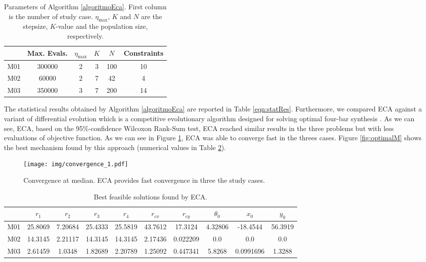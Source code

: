 \documentclass[12pt,letterpape]{article}
\begin{document}
\begin{table}[!ht]
	\centering
	\begin{tabular}{cccccc}
		    & Max. Evals. & $\eta_{\max}$ & $K$ & $N$ & Constraints \\ \hline
		M01 &   300000    &     2         &  3  & 100 & 10\\
		M02 &    60000    &     2         &  7  & 42  & 4 \\
		M03 &   350000    &     3         &  7  & 200 & 14\\
	\end{tabular}
	\caption{Parameters of Algorithm \ref{algoritmoEca}. First column is the number
	of study case. $\eta_{\max}$, $K$ and $N$ are the stepsize, $K$-value and the
	population size, respectively.}
	\label{tab:parms}
\end{table}
% 
% 
The statistical results obtained by Algorithm \ref{algoritmoEca} are reported in
Table \ref{eqn:statRes}. Furthermore, we compared ECA against a variant of differential
evolution \cite{ed1995} which is a competitive evolutionary algorithm designed for solving
optimal four-bar synthesis \cite{hernandez2016}. As we can see, ECA, based on the 95\%-confidence
Wilcoxon Rank-Sum test, ECA reached similar results in the three problems but with
less evaluations of objective function. As we can see in Figure \ref{fig:convMedian1},
ECA was able to converge fast in the threes cases.
Figure \ref{fig:optimalM} shows the best mechanism found by this approach (numerical
values in Table \ref{tab:valuesR}).

\begin{figure}[!ht]
	\centering
	\texttt{[image: img/convergence\_1.pdf]}
	\caption{Convergence at median. ECA provides fast convergence in three the study cases.}
	\label{fig:convMedian1}
\end{figure}

\begin{table}[!ht]
	\centering
	\begin{tabular}{cccccccccc}
		    & $r_1$   &  $r_2$  &   $r_3$ &  $r_4$  & $r_{cx}$&$r_{cy}$ &   $\theta_0$ &  $x_0$    & $y_0$ \\ \hline
		M01 & 25.8069 & 7.20684 & 25.4333 & 25.5819 & 43.7612 & 17.3124 & 4.32806 & -18.4544  & 56.3919 \\
		M02 & 14.3145 & 2.21117 & 14.3145 & 14.3145 & 2.17436 & 0.022209&  0.0    &   0.0     & 0.0 \\
		M03 & 2.61459 & 1.0348  & 1.82689 & 2.20789 & 1.25092 & 0.447341& 5.8268  & 0.0991696 & 1.3288 \\
	\end{tabular}
	\caption{Best feasible solutions found by ECA.}
	\label{tab:valuesR}
\end{table}
\end{document}
